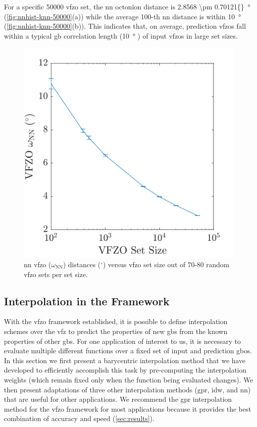 \documentclass[final,twocolumn,12pt]{elsarticle}
\newcommand{\inpt}{input}
\newcommand{\outpt}{prediction}
\newcommand{\nnomega}{2.8568 \pm 0.70121}
\begin{document}
For a specific \num{50000} \gls{vfzo} set, the \gls{nn} octonion distance is \SI{\nnomega{}}{\degree} (\cref{fig:nnhist-knn-50000}(a)) while the average 100-th \gls{nn} distance is within \SI{10}{\degree} (\cref{fig:nnhist-knn-50000}(b)). This indicates that, on average, \outpt{} \glspl{vfzo} fall within a typical \gls{gb} correlation length (\SI{10}{\degree} \cite{olmstedSurveyComputedGrain2009}) of \inpt{} \glspl{vfzo} in large set sizes.
\begin{figure}
    \centering
    \includegraphics[scale=1]{nndist-vs-setsize.png}
    \caption{\Gls{nn} \gls{vfzo} ($\omega_{\text{NN}}$) distances ($^{\circ}$) versus \gls{vfzo} set size out of 70-80 random \gls{vfzo} sets per set size.}
    \label{fig:nndist-vs-setsize}
\end{figure}

\subsection{Interpolation in the  Framework}
\label{sec:methods:interp}

With the \gls{vfzo} framework established, it is possible to define interpolation schemes over the \gls{vfz} to predict the properties of new \glspl{gb} from the known properties of other \glspl{gb}. For one application of interest to us, it is necessary to evaluate multiple different functions over a fixed set of \inpt{} and \outpt{} \glspl{gbo}. In this section we first present a barycentric interpolation method that we have developed to efficiently accomplish this task by pre-computing the interpolation weights (which remain fixed only when the function being evaluated changes). We then present adaptations of three other interpolation methods (\gls{gpr}, \gls{idw}, and \gls{nn}) that are useful for other applications. We recommend the \gls{gpr} interpolation method for the \gls{vfzo} framework for most applications because it provides the best combination of accuracy and speed (\cref{sec:results}).
\end{document}
